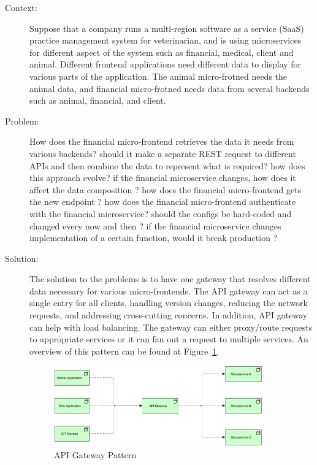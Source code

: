 \documentclass{bmcart}
\begin{document}
\begin{description}
  \item[Context:] Suppose that a company runs a multi-region software as a service (SaaS) practice management system for veterinarian, and is using microservices for different aspect of the system such as financial, medical, client and animal. Different frontend applications need different data to display for various parts of the application. The animal micro-frotned needs the animal data, and financial micro-frotned needs data from several backends such as animal, financial, and client. 
  \item[Problem:] How does the financial micro-frontend retrieves the data it needs from various backends? should it make a separate REST request to different APIs and then combine the data to represent what is required? how does this approach evolve? if the financial microservice changes, how does it affect the data composition ? how does the financial micro-frontend gets the new endpoint ? how does the financial micro-frontend authenticate with the financial microservice? should the configs be hard-coded and changed every now and then ? if the financial microservice changes implementation of a certain function, would it break production ?
  \item[Solution:] The solution to the problems is to have one gateway that resolves different data necessary for various micro-frontends. The API gateway can act as a single entry for all clients, handling version changes, reducing the network requests, and addressing cross-cutting concerns. In addition, API gateway can help with load balancing. The gateway can either proxy/route requests to appropriate services or it can fan out a request to multiple services. An overview of this pattern can be found at Figure~\ref{APIGATEWAY}.
  
  \begin{figure}[h]
    \includegraphics[width=9cm]{Media/API Gateway.jpg}
    \caption{API Gateway Pattern}
    \label{APIGATEWAY}
  \end{figure}

\end{description}
\end{document}
